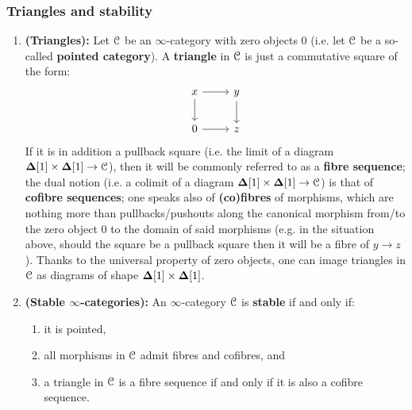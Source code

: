             \subsubsection{Triangles and stability}
                \begin{definition} \label{def: stable_infinity_categories} 
                    \noindent
                    \begin{enumerate}
                        \item \textbf{(Triangles):} Let $\mathcal{C}$ be an $\infty$-category with zero objects $0$ (i.e. let $\mathcal{C}$ be a so-called \textbf{pointed category}). A \textbf{triangle} in $\mathcal{C}$ is just a commutative square of the form:
                            $$
                                \begin{tikzcd}
                                	x & y \\
                                	0 & z
                                	\arrow[from=1-1, to=2-1]
                                	\arrow[from=1-1, to=1-2]
                                	\arrow[from=1-2, to=2-2]
                                	\arrow[from=2-1, to=2-2]
                                \end{tikzcd}
                            $$
                        If it is in addition a pullback square (i.e. the limit of a diagram $\simp[1] \x \simp[1] \to \C$), then it will be commonly referred to as a \textbf{fibre sequence}; the dual notion (i.e. a colimit of a diagram $\simp[1] \x \simp[1] \to \C$) is that of \textbf{cofibre sequences}; one speaks also of \textbf{(co)fibres} of morphisms, which are nothing more than pullbacks/pushouts along the canonical morphism from/to the zero object $0$ to the domain of said morphisms (e.g. in the situation above, should the square be a pullback square then it will be a fibre of $y \to z$). Thanks to the universal property of zero objects, one can image triangles in $\mathcal{C}$ as diagrams of shape $\simp[1] \x \simp[1]$.
                        \item \textbf{(Stable $\infty$-categories):} An $\infty$-category $\mathcal{C}$ is \textbf{stable} if and only if:
                            \begin{enumerate}
                                \item it is pointed,
                                \item all morphisms in $\mathcal{C}$ admit fibres and cofibres, and
                                \item a triangle in $\mathcal{C}$ is a fibre sequence if and only if it is also a cofibre sequence.
                            \end{enumerate}
                    \end{enumerate}
                \end{definition}
